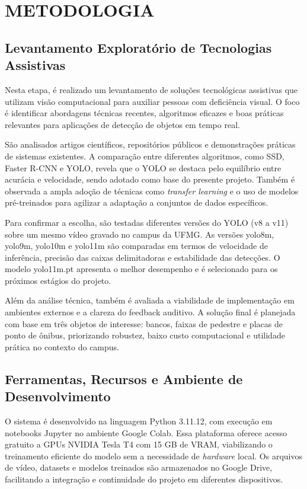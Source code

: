 \chapter{\textbf{METODOLOGIA}}
\section{\textbf{Levantamento Exploratório de Tecnologias Assistivas}}

Nesta etapa, é realizado um levantamento de soluções tecnológicas assistivas que utilizam visão computacional para auxiliar pessoas com deficiência visual. O foco é identificar abordagens técnicas recentes, algoritmos eficazes e boas práticas relevantes para aplicações de detecção de objetos em tempo real.

São analisados artigos científicos, repositórios públicos e demonstrações práticas de sistemas existentes. A comparação entre diferentes algoritmos, como SSD, Faster R-CNN e YOLO, revela que o YOLO se destaca pelo equilíbrio entre acurácia e velocidade, sendo adotado como base do presente projeto. Também é observada a ampla adoção de técnicas como \textit{transfer learning} e o uso de modelos pré-treinados para agilizar a adaptação a conjuntos de dados específicos.

Para confirmar a escolha, são testadas diferentes versões do YOLO (v8 a v11) sobre um mesmo vídeo gravado no campus da UFMG. As versões yolo8m, yolo9m, yolo10m e yolo11m são comparadas em termos de velocidade de inferência, precisão das caixas delimitadoras e estabilidade das detecções. O modelo yolo11m.pt apresenta o melhor desempenho e é selecionado para os próximos estágios do projeto.

Além da análise técnica, também é avaliada a viabilidade de implementação em ambientes externos e a clareza do feedback auditivo. A solução final é planejada com base em três objetos de interesse: bancos, faixas de pedestre e placas de ponto de ônibus, priorizando robustez, baixo custo computacional e utilidade prática no contexto do campus.

\section{\textbf{Ferramentas, Recursos e Ambiente de Desenvolvimento}}

O sistema é desenvolvido na linguagem Python 3.11.12, com execução em notebooks Jupyter no ambiente Google Colab. Essa plataforma oferece acesso gratuito a GPUs NVIDIA Tesla T4 com 15 GB de VRAM, viabilizando o treinamento eficiente do modelo sem a necessidade de \textit{hardware} local. Os arquivos de vídeo, datasets e modelos treinados são armazenados no Google Drive, facilitando a integração e continuidade do projeto em diferentes dispositivos.

